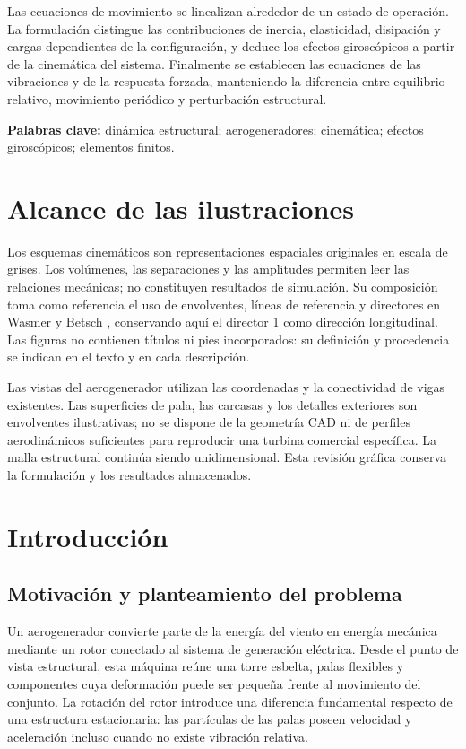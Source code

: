 \documentclass[11pt,a4paper,oneside]{report}
\begin{document}
Las ecuaciones de movimiento se linealizan alrededor de un estado de operación. La formulación distingue las contribuciones de inercia, elasticidad, disipación y cargas dependientes de la configuración, y deduce los efectos giroscópicos a partir de la cinemática del sistema. Finalmente se establecen las ecuaciones de las vibraciones y de la respuesta forzada, manteniendo la diferencia entre equilibrio relativo, movimiento periódico y perturbación estructural.

\noindent\textbf{Palabras clave:} dinámica estructural; aerogeneradores; cinemática; efectos giroscópicos; elementos finitos.

\chapter*{Alcance de las ilustraciones}
Los esquemas cinemáticos son representaciones espaciales originales en escala de grises. Los volúmenes, las separaciones y las amplitudes permiten leer las relaciones mecánicas; no constituyen resultados de simulación. Su composición toma como referencia el uso de envolventes, líneas de referencia y directores en Wasmer y Betsch \cite{wasmer2024}, conservando aquí el director 1 como dirección longitudinal. Las figuras no contienen títulos ni pies incorporados: su definición y procedencia se indican en el texto y en cada descripción.

Las vistas del aerogenerador utilizan las coordenadas y la conectividad de vigas existentes. Las superficies de pala, las carcasas y los detalles exteriores son envolventes ilustrativas; no se dispone de la geometría CAD ni de perfiles aerodinámicos suficientes para reproducir una turbina comercial específica. La malla estructural continúa siendo unidimensional. Esta revisión gráfica conserva la formulación y los resultados almacenados.

\tableofcontents\listoffigures
\clearpage{}
\chapter{Introducción}
\label{ch:introduccion}
\section{Motivación y planteamiento del problema}
Un aerogenerador convierte parte de la energía del viento en energía mecánica mediante un rotor conectado al sistema de generación eléctrica. Desde el punto de vista estructural, esta máquina reúne una torre esbelta, palas flexibles y componentes cuya deformación puede ser pequeña frente al movimiento del conjunto. La rotación del rotor introduce una diferencia fundamental respecto de una estructura estacionaria: las partículas de las palas poseen velocidad y aceleración incluso cuando no existe vibración relativa.
\end{document}
